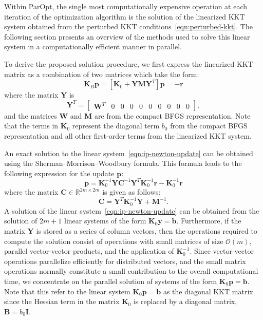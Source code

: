 \documentclass[12pt]{article}
\newcommand{\mb}{\mathbf}
\begin{document}
Within ParOpt, the single most computationally expensive operation at each iteration of the optimization algorithm is the solution of the linearized KKT system obtained from the perturbed KKT conditions~\eqref{eqn:perturbed-kkt}.
The following section presents an overview of the methods used to solve this linear system in a computationally efficient manner in parallel.

To derive the proposed solution procedure, we first express the linearized KKT matrix as a combination of two matrices which take the form:
%
\begin{equation}
  \label{eqn:ip-newton-update}
  \mb{K}_{B} \mb{p} = \left[ \mb{K}_{0} + \mb{Y} \mb{M} \mb{Y}^{T} \right] \mb{p} = - \mb{r}
\end{equation}
where the matrix $\mb{Y}$ is
%
\begin{equation*}
  \mb{Y}^{T} = \begin{bmatrix} \mb{W}^T & 0 & 0 & 0 &
    0 & 0 & 0 & 0 & 0 & 0 \end{bmatrix},
\end{equation*}
and the matrices $\mb{W}$ and $\mb{M}$ are from the compact BFGS representation.
Note that the terms in $\mb{K}_{0}$ represent the diagonal term $b_{0}$ from the compact BFGS representation and all other first-order terms from the linearized KKT system.

An exact solution to the linear system~\eqref{eqn:ip-newton-update} can be obtained using the Sherman--Morrison--Woodbury formula.
This formula leads to the following expression for the update $\mb{p}$:
\begin{equation*}
  \mb{p} = \mb{K}^{-1}_{0} \mb{Y} \mb{C}^{-1} \mb{Y}^{T} \mb{K}_{0}^{-1} \mb{r} - \mb{K}_{0}^{-1} \mb{r}
\end{equation*}
where the matrix $\mb{C} \in \mathbb{R}^{2m \times 2m}$ is given as
follows:
\begin{equation*}
  \mb{C} = \mb{Y}^{T} \mb{K}_{0}^{-1}\mb{Y} + \mb{M}^{-1}.
\end{equation*}
A solution of the linear system~\eqref{eqn:ip-newton-update} can be obtained from the solution of $2m+1$ linear systems of the form $\mb{K}_{0}\mb{y} = \mb{b}$.
Furthermore, if the matrix $\mb{Y}$ is stored as a series of column vectors, then the operations required to compute the solution consist of operations with small matrices of size $\mathcal{O}(m)$, parallel vector-vector products, and the application of $\mb{K}_{0}^{-1}$.
Since vector-vector operations parallelize efficiently for distributed vectors, and the small matrix operations normally constitute a small contribution to the overall computational time, we concentrate on the parallel solution of systems of the form $\mb{K}_{0} \mb{p} =
\mb{b}$.
Note that this refer to the linear system $\mb{K}_{0} \mb{p} = \mb{b}$ as the diagonal KKT matrix since the Hessian term in the matrix $\mb{K}_{0}$ is replaced by a diagonal matrix, $\mb{B} = b_{0}\mb{I}$.
\end{document}
